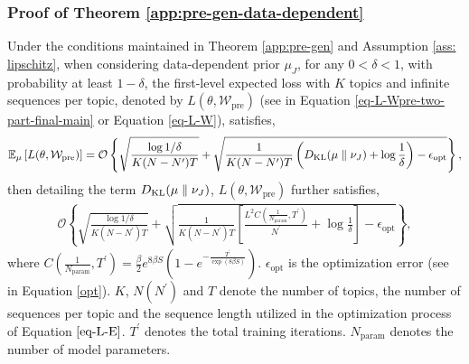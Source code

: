 \subsubsection{Proof of Theorem \ref{app:pre-gen-data-dependent}}\label{appendix-the-2}
\begin{theorem*} Under the conditions maintained in Theorem \ref{app:pre-gen} and Assumption \ref{ass: lipschitz}, when considering data-dependent prior $\mu_J$, for any $0<\delta < 1$, with probability at least $1-\delta$, the first-level expected loss with $K$ topics and infinite sequences per topic, denoted by $L(\theta, \mathcal{W}_{\text{pre}})$ (see in Equation \ref{eq-L-Wpre-two-part-final-main} or Equation \ref{eq-L-W}), satisfies,
	\begin{align*}
			\mathbb{E}_{\mu}\left[L(\theta, \mathcal{W}_{\text{pre}})\right]
			=\mathcal{O}\left\{\sqrt{\frac{ \log 1/\delta}{K(N-N^\prime)T}} + \sqrt{\frac{1}{K(N-N^\prime)T}\left(D_{\mathrm{KL}}(\mu\parallel\nu_J)+\log \frac{1}{\delta}\right)-\epsilon_{\text{opt}}}\right\},
	\end{align*}
	then detailing the term $D_{\mathrm{KL}}(\mu \parallel \nu_J)$, $L(\theta, \mathcal{W}_{\text{pre}})$ further satisfies,
	\begin{align}\label{app-the3-right}
			\mathcal{O}\left\{\sqrt{\frac{\log 1/\delta}{K(N-N^\prime)T}}+\sqrt{\frac{1}{K(N-N^\prime)T}\left[\frac{L^2C(\frac{1}{N_{\text{param}}},T^\prime)}{N^\prime}+\log \frac{1}{\delta}\right]-\epsilon_{\text{opt}}}\right\},
	\end{align}
    where $C(\frac{1}{N_{\text{param}}},T^\prime)=\frac{\beta}{2}e^{8\beta S}\left(1-e^{-\frac{{T^\prime}}{\exp(8\beta S)}}\right)$. $\epsilon_{\text{opt}}$ is the optimization error (see in Equation \ref{opt}). $K$, $N (N^\prime)$ and $T$ denote the number of topics, the number of sequences per topic and the sequence length utilized in the optimization process of Equation $\ref{eq-L-E}$. $T^\prime$ denotes the total training iterations. $N_{\text{param}}$ denotes the number of model parameters.
\end{theorem*}

